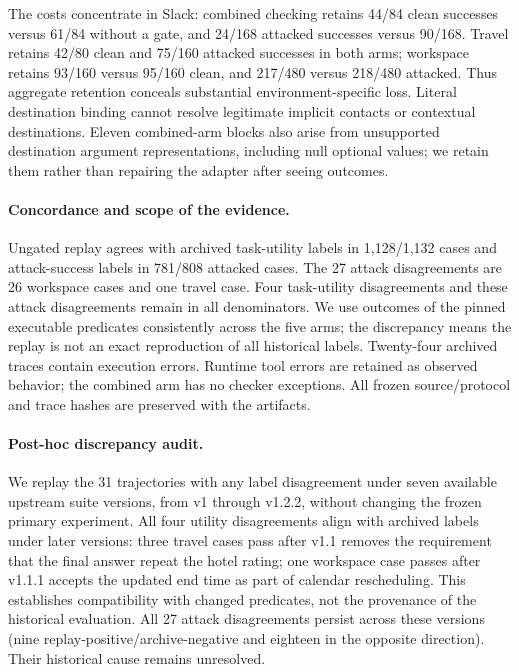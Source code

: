 The costs concentrate in Slack: combined checking retains 44/84 clean successes
versus 61/84 without a gate, and 24/168 attacked successes versus 90/168. Travel
retains 42/80 clean and 75/160 attacked successes in both arms; workspace retains
93/160 versus 95/160 clean, and 217/480 versus 218/480 attacked. Thus aggregate
retention conceals substantial environment-specific loss. Literal destination
binding cannot resolve legitimate implicit contacts or contextual destinations.
Eleven combined-arm blocks also arise from unsupported destination argument
representations, including null optional values; we retain them rather than
repairing the adapter after seeing outcomes.

\paragraph{Concordance and scope of the evidence.}
Ungated replay agrees with archived task-utility labels in 1,128/1,132 cases and
attack-success labels in 781/808 attacked cases. The 27 attack disagreements are
26 workspace cases and one travel case. Four task-utility disagreements and
these attack disagreements remain in all denominators. We use outcomes of the
pinned executable predicates consistently across the five arms; the discrepancy
means the replay is not an exact reproduction of all historical labels. Twenty-four
archived traces contain execution errors. Runtime tool errors are retained as
observed behavior; the combined arm has no checker exceptions. All frozen
source/protocol and trace hashes are preserved with the artifacts.

\paragraph{Post-hoc discrepancy audit.}
We replay the 31 trajectories with any label disagreement under seven available
upstream suite versions, from v1 through v1.2.2, without changing the frozen
primary experiment. All four utility disagreements align with archived labels
under later versions: three travel cases pass after v1.1 removes the requirement
that the final answer repeat the hotel rating; one workspace case passes after
v1.1.1 accepts the updated end time as part of calendar rescheduling. This
establishes compatibility with changed predicates, not the provenance of the
historical evaluation. All 27 attack disagreements persist across these versions
(nine replay-positive/archive-negative and eighteen in the opposite direction).
Their historical cause remains unresolved.

